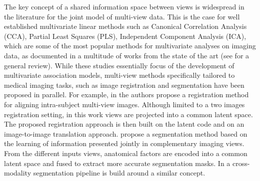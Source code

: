 The key concept of a shared information space between views is widespread in the literature for the joint model of multi-view data.
%
This is the case for well established multivariate linear methods such as
Canonical Correlation Analysis (CCA),
Partial Least Squares (PLS),
Independent Component Analysis (ICA),
which are some of the most popular methods for multivariate analyses on imaging data, as documented in a multitude of works from the state of the art (see \cite{Liu2014} for a general review).
%
While these studies essentially focus of the development of multivariate association models, multi-view methods specifically tailored to medical imaging tasks, such as image registration and segmentation have been proposed in parallel.
For example, in \cite{Qin2019} the authors propose
a registration method for aligning intra-subject multi-view images.
Although limited to a two images registration setting,
in this work views are projected into a common latent space.
The proposed registration approach is then built on the latent code and on an image-to-image translation approach.
%
%
\cite{Chartsias2021} propose a segmentation method based on the learning of information presented jointly in complementary imaging views.
From the different inputs views, anatomical factors are encoded into a common latent space and fused to extract more accurate segmentation masks.
%
%
In \cite{Yang2020} a cross-modality segmentation pipeline is build around a similar concept.
% 
